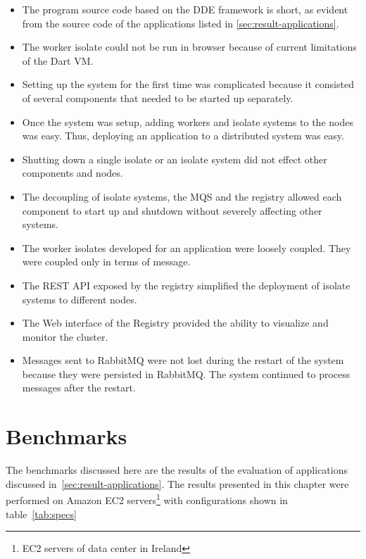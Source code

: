 \begin{itemize}
  \item The program source code based on the DDE framework is short, as evident from the source code of the applications listed in \autoref{sec:result-applications}.

  \item The worker isolate could not be run in browser because of current limitations of the Dart VM.

  \item Setting up the system for the first time was complicated because it consisted of several components that needed to be started up separately.

  \item Once the system was setup, adding workers and isolate systems to the nodes was easy. Thus, deploying an application to a distributed system was easy.

  \item Shutting down a single isolate or an isolate system did not effect other components and nodes.

  \item The decoupling of isolate systems, the MQS and the registry allowed each component to start up and shutdown without severely affecting other systems.

  \item The worker isolates developed for an application were loosely coupled. They were coupled only in terms of message.

  \item The REST API exposed by the registry simplified the deployment of isolate systems to different nodes.

  \item The Web interface of the Registry provided the ability to visualize and monitor the cluster.

  \item Messages sent to RabbitMQ were not lost during the restart of the system because they were persisted in RabbitMQ. The system continued to process messages after the restart.
\end{itemize}

\section{Benchmarks}
\label{sec:benchmarks}
  The benchmarks discussed here are the results of the evaluation of applications discussed in~\autoref{sec:result-applications}. The results presented in this chapter were performed on Amazon EC2 servers\footnote{EC2 servers of data center in Ireland} with configurations shown in table~\autoref{tab:specs}

